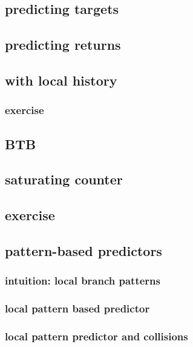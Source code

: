 

\subsection{predicting targets}


\subsection{predicting returns}


\subsection{with local history}


\subsubsection{exercise}


\subsection{BTB}


\subsection{saturating counter}


\subsection{exercise}


\subsection{pattern-based predictors}
\subsubsection{intuition: local branch patterns}

\subsubsection{local pattern based predictor}


\subsubsection{local pattern predictor and collisions}



